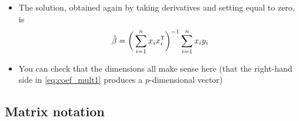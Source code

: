 \documentclass{article}
\begin{document}
\begin{itemize}
\item The solution, obtained again by taking derivatives and setting equal to
  zero, is
  \begin{equation}
  \label{eq:coef_mult1}
  \hat{\beta} = \bigg( \sum_{i=1}^n x_i x_i^{\mathsf{T}} \bigg)^{-1} \sum_{i=1}^n x_i y_i  
  \end{equation}

\item You can check that the dimensions all make sense here (that the right-hand
  side in \eqref{eq:coef_mult1} produces a $p$-dimensional vector)
\end{itemize}

\subsection{Matrix notation}
\end{document}

